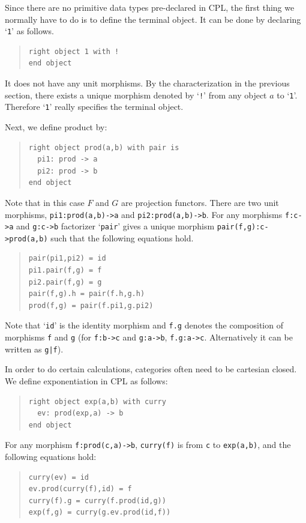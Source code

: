 Since there are no primitive data types pre-declared in CPL, the first thing
we normally have to do is to define the terminal object.  It can be done by
declaring `\verb"1"' as follows.
\begin{quote}
\begin{verbatim}
right object 1 with !
end object
\end{verbatim}
\end{quote}
It does not have any unit morphisms.  By the characterization in the
previous section, there exists a unique morphism denoted by `\verb"!"' from
any object $a$ to `\verb"1"'.  Therefore `\verb"1"' really specifies the
terminal object.

Next, we define product by:
\begin{quote}
\begin{verbatim}
right object prod(a,b) with pair is
  pi1: prod -> a
  pi2: prod -> b
end object
\end{verbatim}
\end{quote}
Note that in this case $F$ and $G$ are projection functors.  There are two
unit morphisms, \verb"pi1:prod(a,b)->a" and \verb"pi2:prod(a,b)->b".  For
any morphisms \verb"f:c->a" and \verb"g:c->b" factorizer `\verb"pair"' gives
a unique morphism \verb"pair(f,g):c->prod(a,b)" such that the following
equations hold.
\begin{quote}
\begin{verbatim}
pair(pi1,pi2) = id
pi1.pair(f,g) = f
pi2.pair(f,g) = g
pair(f,g).h = pair(f.h,g.h)
prod(f,g) = pair(f.pi1,g.pi2)
\end{verbatim}
\end{quote}
Note that `\verb"id"' is the identity morphism and \verb"f.g" denotes the
composition of morphisms \verb"f" and \verb"g" (for \verb"f:b->c" and
 \verb"g:a->b", \verb"f.g:a->c".  Alternatively it can be written as
 \verb"g|f").

In order to do certain calculations, categories often need to be cartesian
closed.  We define exponentiation in CPL as follows:
\begin{quote}
\begin{verbatim}
right object exp(a,b) with curry
  ev: prod(exp,a) -> b
end object
\end{verbatim}
\end{quote}
For any morphism \verb"f:prod(c,a)->b", \verb"curry(f)" is from \verb"c" to
 \verb"exp(a,b)", and the following equations hold:
\begin{quote}
\begin{verbatim}
curry(ev) = id
ev.prod(curry(f),id) = f
curry(f).g = curry(f.prod(id,g))
exp(f,g) = curry(g.ev.prod(id,f))
\end{verbatim}
\end{quote}

